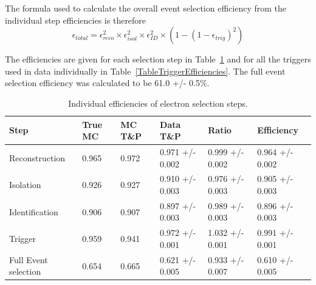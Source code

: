 
The formula used to calculate the overall event selection efficiency 
from the individual step efficiencies is therefore 
\[
\epsilon_{total} = \epsilon_{reco}^2 \times \epsilon_{isol}^2 \times \epsilon_{ID}^2 \times \left( 1 - \left( 1 - \epsilon_{trig} \right)^2 \right)
\]


The efficiencies are given for each selection step in Table~\ref{TableEfficiencies} %
and for all the triggers used in data individually in Table~\ref{TableTriggerEfficiencies}.  
The full event selection efficiency was calculated to be 
61.0 +/- 0.5\%.  

\begin{table}[htbp]
  \begin{center}
    \caption{\fixspacing Individual efficiencies of electron selection steps.}
    \label{TableEfficiencies}
    \begin{tabular}[]{ | l | l | l | l | l | l | }
      \hline
      Step & True MC & MC T\&P & Data T\&P & Ratio & Efficiency \\ \hline \hline
      Reconstruction & 0.965 & 0.972 & 0.971 +/- 0.002 & 0.999 +/- 0.002 & 0.964 +/- 0.002 \\ \hline
      Isolation & 0.926 & 0.927 & 0.910 +/- 0.003 & 0.976 +/- 0.003 & 0.905 +/- 0.003 \\ \hline
      Identification & 0.906 & 0.907 & 0.897 +/- 0.003 & 0.989 +/- 0.003 & 0.896 +/- 0.003 \\ \hline
      Trigger & 0.959 & 0.941 & 0.972 +/- 0.001 & 1.032 +/- 0.001 & 0.991 +/- 0.001 \\ \hline \hline
      Full Event selection & 0.654 & 0.665 & 0.621 +/- 0.005 & 0.933 +/- 0.007 & 0.610 +/- 0.005 \\ \hline
    \end{tabular}
  \end{center}
\end{table}


